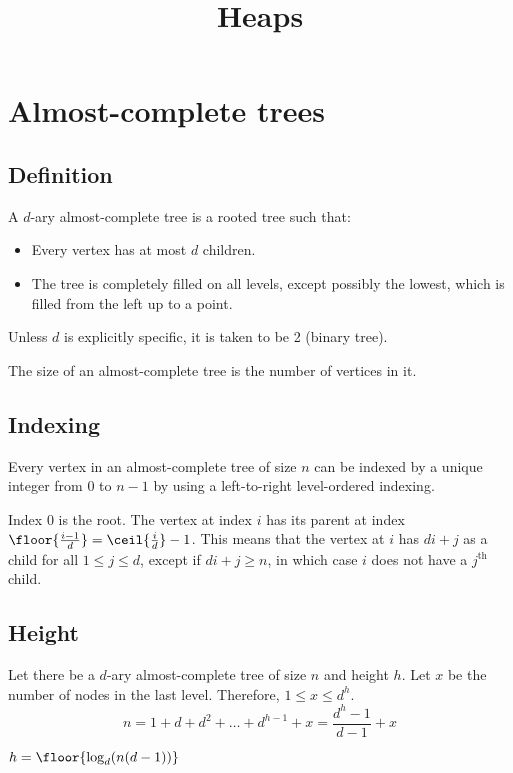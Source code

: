 

\usepackage{algorithm}
\usepackage{algpseudocode}

\title{Heaps}



\initAfterBeginDocument{}

\section{Almost-complete trees}

\subsection{Definition}

A $d$-ary almost-complete tree is a rooted tree such that:
\begin{itemize}
\item Every vertex has at most $d$ children.
\item The tree is completely filled on all levels, except possibly the lowest,
    which is filled from the left up to a point.
\end{itemize}

Unless $d$ is explicitly specific, it is taken to be 2 (binary tree).

The size of an almost-complete tree is the number of vertices in it.

\subsection{Indexing}

Every vertex in an almost-complete tree of size $n$ can be indexed by
a unique integer from $0$ to $n-1$ by using a left-to-right level-ordered indexing.

Index 0 is the root.
The vertex at index $i$ has its parent at index $\floor{\frac{i-1}{d}} = \ceil{\frac{i}{d}}-1$.
This means that the vertex at $i$ has $di+j$ as a child for all $1 \le j \le d$,
except if $di+j \ge n$, in which case $i$ does not have a $j^{\textrm{th}}$ child.

\subsection{Height}

Let there be a $d$-ary almost-complete tree of size $n$ and height $h$.
Let $x$ be the number of nodes in the last level. Therefore, $1 \le x \le d^h$.
\[ n = 1 + d + d^2 + \ldots + d^{h-1} + x = \frac{d^h-1}{d-1} + x \]
\begin{theorem}$h = \floor{\log_d (n(d-1))}$\end{theorem}

